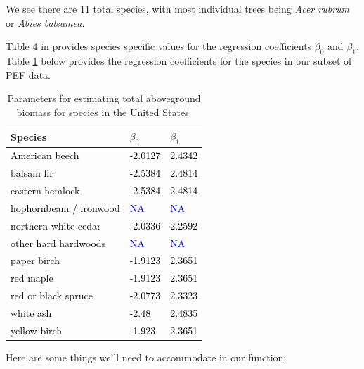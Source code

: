 \documentclass[
  11pt,
]{krantz}
\theoremstyle{definition}
\theoremstyle{definition}
\theoremstyle{definition}
\theoremstyle{definition}
\theoremstyle{remark}
\begin{document}
We see there are 11 total species, with most individual trees being \emph{Acer rubrum} or \emph{Abies balsamea}.

Table 4 in \citet{jenkins03} provides species specific values for the regression coefficients \(\beta_0\) and \(\beta_1\). Table \ref{tab:jenks} below provides the regression coefficients for the species in our subset of PEF data.

\begin{table}

\caption{\label{tab:jenks}Parameters for estimating total aboveground biomass for species in the United States.}
\centering
\begin{tabular}[t]{>{\centering\arraybackslash}p{10em}>{\centering\arraybackslash}p{10em}>{\centering\arraybackslash}p{10em}}
\toprule
Species & $\beta_0$ & $\beta_1$\\
\midrule
\textcolor{black}{American beech} & \textcolor{black}{-2.0127} & \textcolor{black}{2.4342}\\
\textcolor{black}{balsam fir} & \textcolor{black}{-2.5384} & \textcolor{black}{2.4814}\\
\textcolor{black}{eastern hemlock} & \textcolor{black}{-2.5384} & \textcolor{black}{2.4814}\\
\textcolor{black}{hophornbeam / ironwood} & \textcolor{blue}{NA} & \textcolor{blue}{NA}\\
\textcolor{black}{northern white-cedar} & \textcolor{black}{-2.0336} & \textcolor{black}{2.2592}\\
\addlinespace
\textcolor{black}{other hard hardwoods} & \textcolor{blue}{NA} & \textcolor{blue}{NA}\\
\textcolor{black}{paper birch} & \textcolor{black}{-1.9123} & \textcolor{black}{2.3651}\\
\textcolor{black}{red maple} & \textcolor{black}{-1.9123} & \textcolor{black}{2.3651}\\
\textcolor{black}{red or black spruce} & \textcolor{black}{-2.0773} & \textcolor{black}{2.3323}\\
\textcolor{black}{white ash} & \textcolor{black}{-2.48} & \textcolor{black}{2.4835}\\
\addlinespace
\textcolor{black}{yellow birch} & \textcolor{black}{-1.923} & \textcolor{black}{2.3651}\\
\bottomrule
\end{tabular}
\end{table}

Here are some things we'll need to accommodate in our function:
\end{document}
